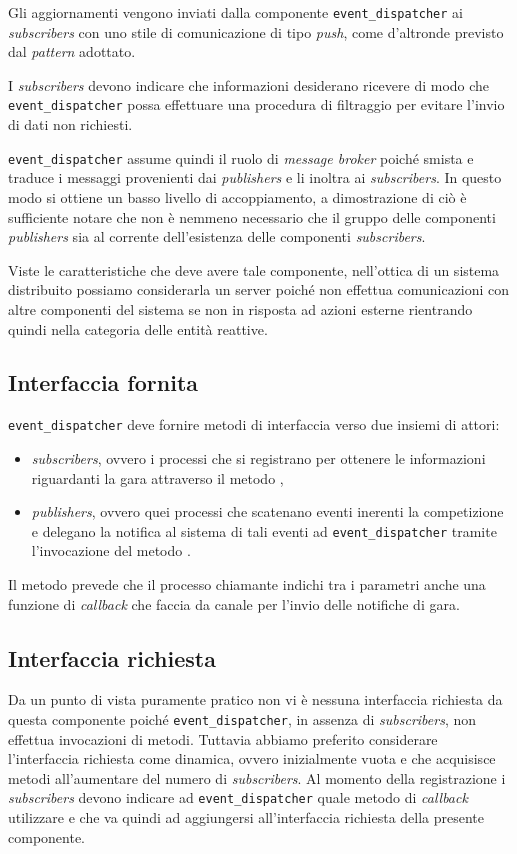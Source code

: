 Gli aggiornamenti vengono inviati dalla componente \texttt{event\_dispatcher} ai \textit{subscribers} con uno stile di comunicazione di tipo \textit{push}, come d'altronde previsto dal \textit{pattern} adottato.

I \textit{subscribers} devono indicare che informazioni desiderano ricevere di modo che \texttt{event\_dispatcher} possa effettuare una procedura di filtraggio per evitare l'invio di dati non richiesti.

\texttt{event\_dispatcher} assume quindi il ruolo di \textit{message broker} poiché smista e traduce i messaggi provenienti dai \textit{publishers} e li inoltra ai \textit{subscribers}. In questo modo si ottiene un basso livello di accoppiamento, a dimostrazione di ciò è sufficiente notare che non è nemmeno necessario che il gruppo delle componenti \textit{publishers} sia al corrente dell'esistenza delle componenti \textit{subscribers}.

Viste le caratteristiche che deve avere tale componente, nell'ottica di un sistema distribuito possiamo considerarla un server poiché non effettua comunicazioni con altre componenti del sistema se non in risposta ad azioni esterne rientrando quindi nella categoria delle entità reattive.

\subsection*{Interfaccia fornita}
\texttt{event\_dispatcher} deve fornire metodi di interfaccia verso due insiemi di attori:
\begin{itemize}
\item \textit{subscribers}, ovvero i processi che si registrano per ottenere le informazioni riguardanti la gara attraverso il metodo ,
\item \textit{publishers}, ovvero quei processi che scatenano eventi inerenti la competizione e delegano la notifica al sistema di tali eventi ad \texttt{event\_dispatcher} tramite l'invocazione del metodo .
\end{itemize}
Il metodo  prevede che il processo chiamante indichi tra i parametri anche una funzione di \textit{callback} che faccia da canale per l'invio delle notifiche di gara.

\subsection*{Interfaccia richiesta}
Da un punto di vista puramente pratico non vi è nessuna interfaccia richiesta da questa componente poiché \texttt{event\_dispatcher}, in assenza di \textit{subscribers}, non effettua invocazioni di metodi. Tuttavia abbiamo preferito considerare l'interfaccia richiesta come dinamica, ovvero inizialmente vuota e che acquisisce metodi all'aumentare del numero di \textit{subscribers}. Al momento della registrazione i \textit{subscribers} devono indicare ad \texttt{event\_dispatcher} quale metodo di \textit{callback} utilizzare e che va quindi ad aggiungersi all'interfaccia richiesta della presente componente.


